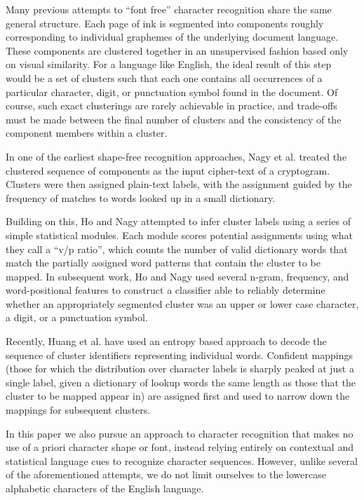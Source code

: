\documentclass[times, 10pt,twocolumn]{article}
\begin{document}
Many previous attempts to ``font free'' character recognition share
the same general structure. Each page of ink is segmented into components
roughly corresponding to individual graphemes of the 
underlying document language. These components are clustered together in an 
unsupervised fashion based only on visual similarity.  For a language like 
English, the ideal result of this step would be a set of clusters such that
each one contains all occurrences of a particular 
character, digit, or punctuation symbol found in the document.
Of course, such exact clusterings are rarely achievable in practice, and 
trade-offs must be made between the final number of clusters and the 
consistency of the component members within a cluster.

In one of the earliest shape-free recognition approaches, Nagy et al. treated
the clustered sequence of components as the input cipher-text of a 
cryptogram\cite{nagy1987}.  Clusters were then assigned plain-text labels, 
with the assignment guided by the frequency of matches to words looked up in a 
small dictionary.


Building on this, Ho and Nagy attempted to infer cluster labels using a series 
of simple statistical modules\cite{ho2000}.  Each module scores potential 
assignments using what they call a ``v/p ratio'', which counts the number of 
valid dictionary words that match the partially assigned word patterns that 
contain the cluster to be mapped.  In subsequent work, Ho and Nagy used 
several n-gram, frequency, and word-positional features to construct a 
classifier able to reliably determine whether an appropriately segmented 
cluster was an upper or lower case character, a digit, or a 
punctuation symbol\cite{ho2001}.

Recently, Huang et al. have used an entropy based approach to decode the
sequence of cluster identifiers representing individual words\cite{huang2006}.  
Confident mappings (those for which the distribution over character labels is 
sharply peaked at just a single label, given a dictionary of lookup words the 
same length as those that the cluster to be mapped appear in) are assigned 
first and used to narrow down the mappings for subsequent clusters.

In this paper we also pursue an approach to character recognition that 
makes no use of a priori character shape or font, instead relying entirely on 
contextual and statistical language cues to recognize character sequences.  
However, unlike several of the aforementioned attempts, we do not limit 
ourselves to the lowercase alphabetic characters of the English language. 
\end{document}
